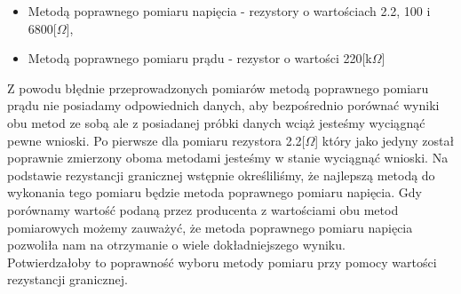 \documentclass[11pt]{article}
\begin{document}
    \begin{itemize}
        \item Metodą poprawnego pomiaru napięcia - rezystory o wartościach 2.2, 100 i 6800[$\Omega$],
        \item Metodą poprawnego pomiaru prądu - rezystor o wartości 220[k$\Omega$]
    \end{itemize}
    Z powodu błędnie przeprowadzonych pomiarów metodą poprawnego pomiaru prądu nie posiadamy odpowiednich
    danych, aby bezpośrednio porównać wyniki obu metod ze sobą ale z posiadanej próbki danych wciąż jesteśmy wyciągnąć pewne wnioski.
    Po pierwsze dla pomiaru rezystora 2.2[$\Omega$] który jako jedyny został poprawnie zmierzony oboma metodami
    jesteśmy w stanie wyciągnąć wnioski. Na podstawie rezystancji granicznej wstępnie określiliśmy, że najlepszą metodą do wykonania tego
    pomiaru będzie metoda poprawnego pomiaru napięcia. Gdy porównamy wartość podaną przez producenta z wartościami obu metod pomiarowych
    możemy zauważyć, że metoda poprawnego pomiaru napięcia pozwoliła nam na otrzymanie o wiele dokładniejszego wyniku.\\
    Potwierdzałoby to poprawność wyboru metody pomiaru przy pomocy wartości rezystancji granicznej.\\\\
\end{document}
